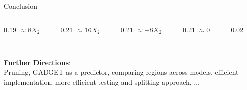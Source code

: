 \documentclass[10pt,compress,t,notes=noshow,xcolor=table]{beamer}
\begin{document}
\begin{framev}[align=top]{Conclusion}
{\begin{footnotesize}
\begin{columns}[T,totalwidth=\linewidth]
\begin{column}{0.19\linewidth}
\centering
$\approx 8X_2$ %
\end{column}
\begin{column}{0.21\linewidth}
\centering
$\approx 16X_2$ %
\end{column}
\begin{column}{0.21\linewidth}
\centering
$ \approx -8X_2$ %
\end{column}
\begin{column}{0.21\linewidth}
\centering
$\approx 0$%
\end{column}
\begin{column}{0.02\linewidth}
\end{column}
\end{columns}
\end{footnotesize}
\spacer[0]
}
\spacer[0.25] \\
\textbf{Further Directions}:\\
\spacer[0.25]
Pruning, GADGET as a predictor, comparing regions across models, efficient implementation, more efficient testing and splitting approach, $\dots$
\end{framev}


\endlecture
\end{document}
